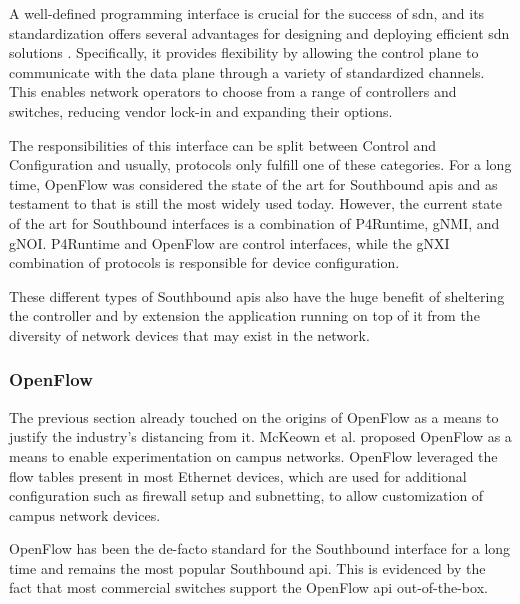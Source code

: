 A well-defined programming interface is crucial for the success of \gls{sdn}, and its standardization offers several advantages for designing and deploying efficient \gls{sdn} solutions\cite{latif_comprehensive_2020} \cite{kreutz_software-defined_2015}. Specifically, it provides flexibility by allowing the control plane to communicate with the data plane through a variety of standardized channels. This enables network operators to choose from a range of controllers and switches, reducing vendor lock-in and expanding their options.

The responsibilities of this interface can be split between Control and Configuration\cite{peterson_software-defined_2021} and usually, protocols only fulfill one of these categories. For a long time, OpenFlow was considered the state of the art for Southbound \glspl{api} and as testament to that is still the most widely used today\cite{latif_comprehensive_2020}. However, the current state of the art for Southbound interfaces is a combination of P4Runtime, gNMI, and gNOI. P4Runtime and OpenFlow are control interfaces, while the gNXI combination of protocols is responsible for device configuration\cite{peterson_software-defined_2021}.

These different types of Southbound \glspl{api} also have the huge benefit of sheltering the controller and by extension the application running on top of it from the diversity of network devices that may exist in the network. \cite{peterson_software-defined_2021}

\subsubsection{OpenFlow}
The previous section already touched on the origins of OpenFlow as a means to justify the industry's distancing from it. McKeown et al. proposed OpenFlow\cite{mckeown_openflow_2008} as a means to enable experimentation on campus networks. OpenFlow leveraged the flow tables present in most Ethernet devices, which are used for additional configuration such as firewall setup and subnetting, to allow customization of campus network devices. \cite{xia_survey_2015}

OpenFlow has been the de-facto standard for the Southbound interface for a long time\cite{nunes_survey_2014} and remains the most popular Southbound \gls{api}. This is evidenced by the fact that most commercial switches support the OpenFlow \gls{api} out-of-the-box\cite{kreutz_software-defined_2015}.

